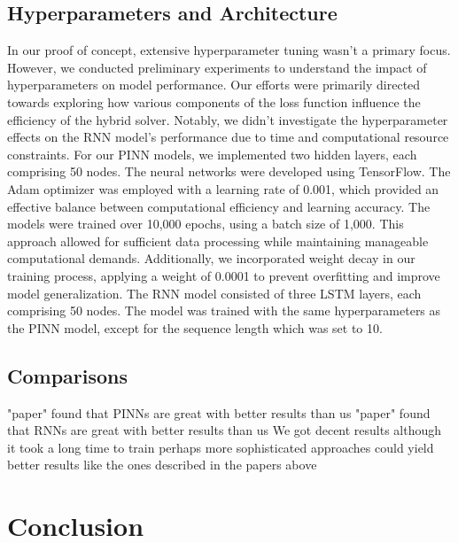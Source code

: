 \documentclass[twoside,11pt]{report}
\begin{document}
\subsection{Hyperparameters and Architecture}
\label{sec:hyperparameters}

    In our proof of concept, extensive hyperparameter tuning wasn't a primary focus. 
    However, we conducted preliminary experiments to understand the impact of hyperparameters 
    on model performance. Our efforts were primarily directed towards exploring how various 
    components of the loss function influence the efficiency of the hybrid solver. Notably, 
    we didn't investigate the hyperparameter effects on the RNN model's performance due to time 
    and computational resource constraints.
    For our PINN models, we implemented two hidden layers, each comprising 50 nodes. The neural 
    networks were developed using TensorFlow\cite{tensorflow2015-whitepaper}. The Adam optimizer was 
    employed with a learning 
    rate of 0.001, which provided an effective balance between computational efficiency and learning accuracy. 
    The models were trained over 10,000 epochs, using a batch size of 1,000. This approach allowed for 
    sufficient data processing while maintaining manageable computational demands. Additionally, 
    we incorporated weight decay in our training process, applying a weight of 0.0001 to prevent 
    overfitting and improve model generalization.
    The RNN model consisted of three LSTM layers, each comprising 50 nodes. The model was trained
    with the same hyperparameters as the PINN model, except for the sequence length which was set to 10.


\subsection{Comparisons}
\label{sec:comparisons}

    "paper" found that PINNs are great with better results than us
    "paper" found that RNNs are great with better results than us
    We got decent results although it took a long time to train
    perhaps more sophisticated approaches could yield better results
    like the ones described in the papers above

\clearpage
\section{Conclusion}
\label{sec:conclusion}
\end{document}
